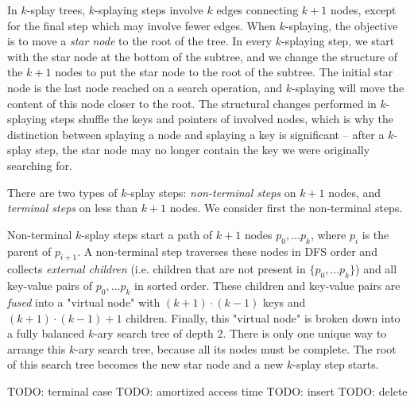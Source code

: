 In $k$-splay trees, $k$-splaying steps involve $k$ edges connecting
$k+1$ nodes, except for the final step which may involve fewer edges.
When $k$-splaying, the objective is to move a \textit{star node} to the
root of the tree. In every $k$-splaying step, we start with the star node
at the bottom of the subtree, and we change the structure of the $k+1$
nodes to put the star node to the root of the subtree.
The initial star node is the last node reached on a search operation, and
$k$-splaying will move the content of this node closer to the root.
The structural changes performed in $k$-splaying steps shuffle the keys and
pointers of involved nodes, which is why the distinction between splaying
a node and splaying a key is significant -- after a $k$-splay step,
the star node may no longer contain the key we were originally searching for.

There are two types of $k$-splay steps: \textit{non-terminal steps} on
$k+1$ nodes, and \textit{terminal steps} on less than $k+1$ nodes.
We consider first the non-terminal steps.

Non-terminal $k$-splay steps start a path of $k+1$ nodes $p_0,\ldots p_{k}$,
where $p_i$ is the parent of $p_{i+1}$. A non-terminal step traverses these
nodes in DFS order and collects \textit{external children} (i.e. children
that are not present in $\{p_0,\ldots p_k\}$) and all key-value pairs of
$p_0,\ldots p_k$ in sorted order.
These children and key-value pairs are \textit{fused} into a "virtual node"
with $(k+1)\cdot (k-1)$ keys and $(k+1)\cdot(k-1) + 1$ children. Finally,
this "virtual node" is broken down into a fully balanced $k$-ary
search tree of depth 2. There is only one unique way to arrange this
$k$-ary search tree, because all its nodes must be complete. The root of this
search tree becomes the new star node and a new $k$-splay step starts.

TODO: terminal case
TODO: amortized access time
TODO: insert
TODO: delete
